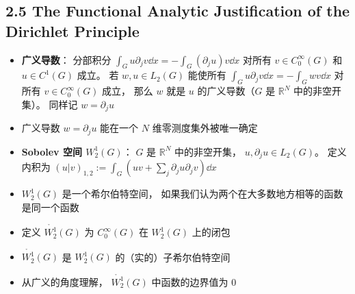 \subsection{2.5 The Functional Analytic Justification of the Dirichlet Principle}
\begin{itemize}
\item \textbf{广义导数}： 分部积分 $\int_G u\partial_j v\dd{x} = -\int_G (\partial_j u)v\dd{x}$ 对所有 $v \in C_0^\infty(G)$ 和 $u \in C^1(G)$ 成立。 若 $w, u\in L_2(G)$ 能使所有 $\int_G u\partial_j v\dd{x} = -\int_G wv\dd{x}$ 对所有 $v \in C_0^\infty(G)$ 成立， 那么 $w$ 就是 $u$ 的广义导数（$G$ 是 $\mathbb R^N$ 中的非空开集）。 同样记 $w = \partial_j u$

\item 广义导数 $w = \partial_j u$ 能在一个 $N$ 维零测度集外被唯一确定

\item \textbf{Sobolev 空间 $W_2^1(G)$}： $G$ 是 $\mathbb R^N$ 中的非空开集， $u, \partial_ju \in L_2(G)$。 定义内积为 $(u|v)_{1,2} := \int_G(uv + \sum_j \partial_j u\partial_j v) \dd{x}$

\item $W_2^1(G)$ 是一个希尔伯特空间， 如果我们认为两个在大多数地方相等的函数是同一个函数

\item 定义 $\mathring {W_2^1}(G)$ 为 $C_0^\infty(G)$ 在 $W_2^1(G)$ 上的闭包

\item $\mathring {W_2^1}(G)$ 是 $W_2^1(G)$ 的（实的）子希尔伯特空间

\item 从广义的角度理解， $\mathring {W_2^1}(G)$ 中函数的边界值为 0
\end{itemize}

